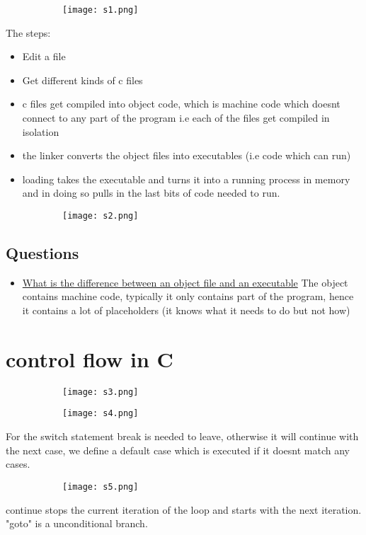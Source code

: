 \documentclass[8pt]{extreport}
\begin{document}
\begin{figure}[H]
\centering
\begin{subfigure}[b]{0.4\linewidth}
\texttt{[image: s1.png]}
\end{subfigure}\end{figure}
The steps:
\begin{itemize}
\item Edit a file
\item Get different kinds of c files
\item c files get compiled into object code, which is machine code which doesnt connect to any part of the program i.e each of the files get compiled in isolation
\item the linker converts the object files into executables (i.e code which can run)
\item loading takes the executable and turns it into a running process in memory and in doing so pulls in the last bits of code needed to run.
\end{itemize}

\begin{figure}[H]
\centering
\begin{subfigure}[b]{0.4\linewidth}
\texttt{[image: s2.png]}
\end{subfigure}\end{figure}

\subsection{Questions}
\begin{itemize}

\item \underline{What is the difference between an object file and an executable} The object contains machine code, typically it only contains part of the program, hence it contains a lot of placeholders (it knows what it needs to do but not how)
\end{itemize}
\section{control flow in C}
\begin{figure}[H]
\centering
\begin{subfigure}[b]{0.4\linewidth}
\texttt{[image: s3.png]}
\end{subfigure}
\begin{subfigure}[b]{0.4\linewidth}
\texttt{[image: s4.png]}
\end{subfigure}
\end{figure}
For the switch statement break is needed to leave, otherwise it will continue with the next case, we define a default case which is executed if it doesnt match any cases.
\begin{figure}[H]
\centering
\begin{subfigure}[b]{0.4\linewidth}
\texttt{[image: s5.png]}
\end{subfigure}
\end{figure}
continue stops the current iteration of the loop and starts with the next iteration. "goto" is a unconditional branch.
\end{document}
